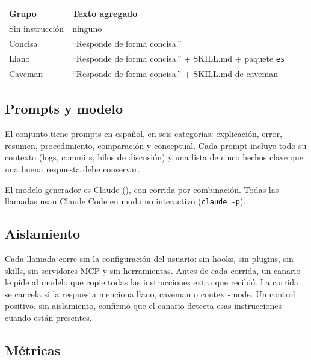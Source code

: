 \documentclass[11pt,a4paper]{article}
\begin{document}
\begin{center}
\begin{tabular}{ll}
\toprule
Grupo & Texto agregado \\
\midrule
Sin instrucción & ninguno \\
Concisa & ``Responde de forma concisa.'' \\
Llano & ``Responde de forma concisa.'' + SKILL.md + paquete \texttt{es} \\
Caveman & ``Responde de forma concisa.'' + SKILL.md de caveman \\
\bottomrule
\end{tabular}
\end{center}

\subsection{Prompts y modelo}

El conjunto tiene \evalPrompts{} prompts en español, en seis categorías: explicación, error, resumen, procedimiento, comparación y conceptual. Cada prompt incluye todo su contexto (logs, commits, hilos de discusión) y una lista de cinco hechos clave que una buena respuesta debe conservar.

El modelo generador es Claude \evalModel{} (\texttt{\evalModelId}), con \evalRuns{} corrida por combinación. Todas las llamadas usan Claude Code \evalCli{} en modo no interactivo (\texttt{claude -p}).

\subsection{Aislamiento}

Cada llamada corre sin la configuración del usuario: sin hooks, sin plugins, sin skills, sin servidores MCP y sin herramientas. Antes de cada corrida, un canario le pide al modelo que copie todas las instrucciones extra que recibió. La corrida se cancela si la respuesta menciona llano, caveman o context-mode. Un control positivo, sin aislamiento, confirmó que el canario detecta esas instrucciones cuando están presentes.

\subsection{Métricas}
\end{document}
